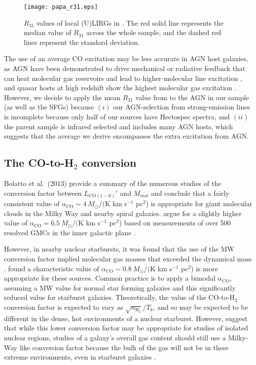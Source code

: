 \documentclass[a4paper,fleqn,usenatbib]{mnras}
\newcommand{\aco}{\alpha_{\mathrm{CO}}}
\begin{document}
\begin{figure}
\centering
\texttt{[image: papa\_r31.eps]}
\caption{$R_{31}$ values of local (U)LIRGs in \citet{2012MNRAS.426.2601P}. The red solid line represents the median value of $R_{31}$ across the whole sample, and the dashed red lines represent the standard deviation. }
\label{fig:r31}
\end{figure}

The use of an average CO excitation may be less accurate in AGN host galaxies, as AGN have been demonstrated to drive mechanical or radiative feedback that can heat molecular gas reservoirs and lead to higher molecular line excitation \citep[e.g.][]{2008A&A...491..483P,2010A&A...518L..42V}, and quasar hosts at high redshift show the highest molecular gas excitation \citep{1997ApJ...484..695B,2009ApJ...703.1338R}. However, we decide to apply the mean $R_{31}$ value from \citet{2012MNRAS.426.2601P} to the AGN in our sample (as well as the SFGs) because $(i)$ our AGN-selection from strong-emission lines is incomplete because only half of our sources have Hectospec spectra, and $(ii)$ the \citet{2012MNRAS.426.2601P} parent sample is infrared selected and includes many AGN hosts, which suggests that the average we derive encompasses the extra excitation from AGN.  

\subsection{The CO-to-H$_{2}$ conversion}\label{sec:alpha_co}

Bolatto et al.\ (2013) provide a summary of the numerous studies of the conversion factor between $L_{\mathrm{CO(1-0)}}'$ and $M_{mol}$ and conclude that a fairly consistent value of $\aco \sim 4~M_{\odot}/($K km s$^{-1}$ pc$^{2}$) is appropriate for giant molecular clouds in the Milky Way and nearby spiral galaxies. \citet{2016ApJ...820...83S} argue for a slightly higher value of $\aco = 6.5~ M_{\odot}/($K km s$^{-1}$ pc$^{2}$) based on measurements of over 500 resolved GMCs in the inner galactic plane \citep{1987ApJS...63..821S,1987ApJ...319..730S}.

However, in nearby nuclear starbursts, it was found that the use of the MW conversion factor implied molecular gas masses that exceeded the dynamical mass \citep{1999AJ....117.2632B}.  \citet{1998ApJ...507..615D} found a characteristic value of $\aco \sim 0.8~M_{\odot}/($K km s$^{-1}$ pc$^{2}$) is more appropriate for these sources. Common practice is to apply a bimodal $\aco$, assuming a MW value for normal star forming galaxies and this significantly reduced value for starburst galaxies.  Theoretically, the value of the CO-to-H$_{2}$ conversion factor  is expected to vary as $\sqrt{n_{\mathrm{H_{2}}}} / T_{k}$, and so may be expected to be different in the dense, hot environments of a nuclear starburst.  However, \citet{2016ApJ...820...83S} suggest that while this lower conversion factor may be appropriate for studies of isolated nuclear regions, studies of a galaxy's overall gas content should still use a Milky-Way like conversion factor because the bulk of the gas will not be in these extreme environments, even in starburst galaxies \citep[also see discussion in][]{2015ApJ...800...70S,2016arXiv160509381S}. 
\end{document}
